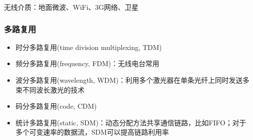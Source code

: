无线介质：地面微波、WiFi、3G网络、卫星

\subsubsection{多路复用}
\begin{itemize}
	\item 时分多路复用(time division multiplexing, TDM)
	\item 频分多路复用(frequency, FDM)：无线电台常用
	\item 波分多路复用(wavelength, WDM)：利用多个激光器在单条光纤上同时发送多束不同波长激光的技术
	\item 码分多路复用(code, CDM)
	\item 统计多路复用(static, SDM)：动态分配方法共享通信链路，比如FIFO；对于多个可变速率的数据流，SDM可以提高链路利用率
\end{itemize}
